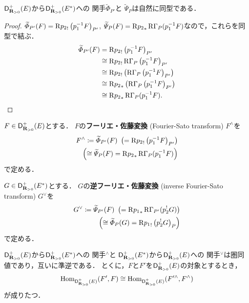 \begin{THM}[{\cite[Theorem 3.7.7]{KS90}}]
    \(\mathop{\mathsf{D}^{+}_{\mathbf{R}_{>0}}}\nolimits(E)\)から\(\mathop{\mathsf{D}^{+}_{\mathbf{R}_{>0}}}\nolimits(E^\ast)\)への
    関手\(\widetilde{\varPhi}_{P'}\)と
    \(\widetilde{\varPsi}_{P}\)は自然に同型である．
\end{THM}
\begin{proof}
    \(
        \widetilde{\varPhi}_{P'}(F)
        =\mathrm{R}{p_2}_!\left(p_1^{-1}F\right)_{P'}
    \), \(
        \widetilde{\varPsi}_{P}(F)
        =\mathrm{R}{p_2}_{\ast}\mathop{\mathrm{R}\hspace{-0pt}\Gamma}\nolimits_{P}(p_1^{-1}F)
    \)なので，これらを同型で結ぶ．
    \begin{align*}
        \widetilde{\varPhi}_{P'}(F)
        &=\mathrm{R}{p_2}_!\left(p_1^{-1}F\right)_{P'}\\
        &\cong\mathrm{R}{p_2}_!\mathop{\mathrm{R}\hspace{-0pt}\Gamma}\nolimits_{P}\left(p_1^{-1}F\right)_{P'}\\
        &\cong\mathrm{R}{p_2}_!\left(\mathop{\mathrm{R}\hspace{-0pt}\Gamma}\nolimits_{P}\left(p_1^{-1}F\right)_{P'}\right)\\
        &\cong\mathrm{R}{p_2}_{\ast}\left(
            \mathop{\mathrm{R}\hspace{-0pt}\Gamma}\nolimits_{P}\left(p_1^{-1}F\right)_{P'}
        \right)\\
        &\cong\mathrm{R}{p_2}_{\ast}\mathop{\mathrm{R}\hspace{-0pt}\Gamma}\nolimits_{P}(p_1^{-1}F).
    \end{align*}
\end{proof}
\begin{DFN}[{\cite[Definition 3.7.8]{KS90}}]
    \(F\in\mathop{\mathsf{D}^{+}_{\mathbf{R}_{>0}}}\nolimits(E)\)とする．
    \(F\)の\textbf{フーリエ・佐藤変換} (Fourier-Sato transform) 
    \(F^{\wedge}\)を
    \begin{align*}
        F^{\wedge}
        \coloneqq \widetilde{\varPhi}_{P'}(F)\
        \left(=\mathrm{R}{p_2}_!\left(p_1^{-1}F\right)_{P'}\right)\\
        \left(
            \cong\widetilde{\varPsi}_{P}(F)
            =\mathrm{R}{p_2}_{\ast}\mathop{\mathrm{R}\hspace{-0pt}\Gamma}\nolimits_{P}(p_1^{-1}F)
        \right)
    \end{align*}
    で定める．

    \(G\in\mathop{\mathsf{D}^{+}_{\mathbf{R}_{>0}}}\nolimits(E^\ast)\)とする．
    \(G\)の\textbf{逆フーリエ・佐藤変換} (inverse 
    Fourier-Sato transform) \(G^{\vee}\)を
    \begin{align*}
        G^{\vee}
        \coloneqq \widetilde{\varPsi}_{P'}(F)\
        \left(=\mathrm{R}{p_1}_{\ast}\mathop{\mathrm{R}\hspace{-0pt}\Gamma}\nolimits_{P'}(p_2^{!}G)\right)\\
        \left(
            \cong \widetilde{\varPhi}_{P}(G)
            =\mathrm{R}{p_1}_!\left(p_2^{!}G\right)_{P}
        \right)
    \end{align*}
    で定める．
\end{DFN}
\begin{THM}[{\cite[Theorem 3.7.9]{KS90}}]
    \(\mathop{\mathsf{D}^{+}_{\mathbf{R}_{>0}}}\nolimits(E)\)から\(\mathop{\mathsf{D}^{+}_{\mathbf{R}_{>0}}}\nolimits(E^\ast)\)への
    関手\({}^{\wedge}\)と
    \(\mathop{\mathsf{D}^{+}_{\mathbf{R}_{>0}}}\nolimits(E^\ast)\)から\(\mathop{\mathsf{D}^{+}_{\mathbf{R}_{>0}}}\nolimits(E)\)への
    関手\({}^{\vee}\)は圏同値であり，互いに準逆である．
    とくに，\(F\)と\(F'\)を\(\mathop{\mathsf{D}^{+}_{\mathbf{R}_{>0}}}\nolimits(E)\)の対象とするとき，
    \[
        \mathop{\mathrm{Hom}}\nolimits_{\mathop{\mathsf{D}^{+}_{\mathbf{R}_{>0}}}\nolimits(E)}(F',F)\cong
        \mathop{\mathrm{Hom}}\nolimits_{\mathop{\mathsf{D}^{+}_{\mathbf{R}_{>0}}}\nolimits(E)}(F'^{\wedge},F^{\wedge})
    \]
    が成りたつ．
\end{THM}
